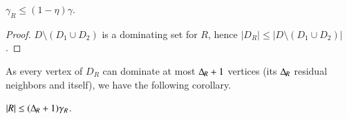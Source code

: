 \begin{lemma}\label{lem:size-DR}
$\gamma_R\leq (1-\eta)\gamma$.
\end{lemma}
\begin{proof}
$D\setminus(D_1\cup D_2)$ is a dominating set for $R$, hence
$|D_R|\leq |D\setminus(D_1\cup D_2)|$.
\end{proof}



As every vertex of $D_R$ can dominate at most $\Delta_{\hspace{-1pt}R}+1$ vertices (its $\Delta_{\hspace{-1pt}R}$ residual neighbors and itself), we have the following corollary.

\begin{corollary}\label{cor:size-R}
  $|R|\leq (\Delta_{\hspace{-1pt}R}+1)\gamma_R$.
\end{corollary}
